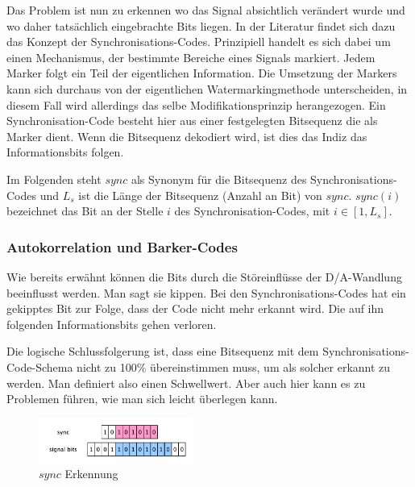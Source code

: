 Das Problem ist nun zu erkennen wo das Signal absichtlich verändert wurde und wo daher tatsächlich eingebrachte Bits liegen. In der Literatur findet sich dazu das Konzept der Synchron\-isations-Codes\cite{xiang2007robust}\cite{chang2012location}\cite{li2000transparent}\cite{ansari2004data}\cite{huang2002blind}\cite{petrovic1999data}\cite{wu2005efficiently}. Prinzipiell handelt es sich dabei um einen Mechanismus, der bestimmte Bereiche eines Signals markiert. Jedem Marker folgt ein Teil der eigentlichen Information. Die Umsetzung der Markers kann sich durchaus von der eigentlichen Watermarkingmethode unterscheiden, in diesem Fall wird allerdings das selbe Modifikationsprinzip herangezogen. 
Ein Synchronisation-Code besteht hier aus einer festgelegten Bitsequenz die als Marker dient. Wenn die Bitsequenz dekodiert wird, ist dies das Indiz das Informationsbits folgen. 

Im Folgenden steht $sync$ als Synonym für die Bitsequenz des Synchronisations-Codes und ${L}_{s}$ ist die L\"ange der Bitsequenz (Anzahl an Bit) von $sync$. $sync(i)$ bezeichnet das Bit an der Stelle $i$ des Synchronisation-Codes, mit $i\in[1,{L}_{s}]$.

\subsubsection{Autokorrelation und Barker-Codes}
\label{sec:barker-code}


Wie bereits erwähnt können die Bits durch die Störeinflüsse der D/A-Wandlung beeinflusst werden. Man sagt sie \glqq{}kippen\grqq{}. Bei den Synchronisations-Codes hat ein gekipptes Bit zur Folge, dass der Code nicht mehr erkannt wird. Die auf ihn folgenden Informationsbits gehen verloren. 

Die logische Schlussfolgerung ist, dass eine Bitsequenz mit dem Synchronisations-Code-Schema nicht zu 100\% übereinstimmen muss, um als solcher erkannt zu werden. Man definiert also einen Schwellwert. Aber auch hier kann es zu Problemen führen, wie man sich leicht überlegen kann. 

\begin{figure}
	\includegraphics[width=0.45\textwidth]{figures/figure-sync-code-detection.pdf}
	\caption{$sync$ Erkennung}
	\label{fig:sync-code-detection}
\end{figure}

